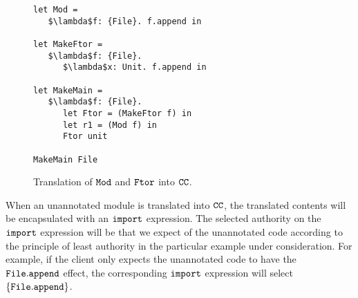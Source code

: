 \begin{figure}[h]

\begin{lstlisting}
let Mod =
   $\lambda$f: {File}. f.append in

let MakeFtor =
   $\lambda$f: {File}.
      $\lambda$x: Unit. f.append in

let MakeMain =
   $\lambda$f: {File}.
      let Ftor = (MakeFtor f) in
      let r1 = (Mod f) in
      Ftor unit

MakeMain File
\end{lstlisting}

\caption{Translation of $\mathtt{Mod}$ and $\mathtt{Ftor}$ into $\mathtt{CC}$.}
\label{fig:wyv_tutorial_desugaring}
\end{figure}

When an unannotated module is translated into $\mathtt{CC}$, the translated contents will be encapsulated with an $\mathtt{import}$ expression. The selected authority on the $\mathtt{import}$ expression will be that we expect of the unannotated code according to the principle of least authority in the particular example under consideration. For example, if the client only expects the unannotated code to have the $\mathtt{File.append}$ effect, the corresponding $\mathtt{import}$ expression will select $\mathtt{\{File.append\}}$.
